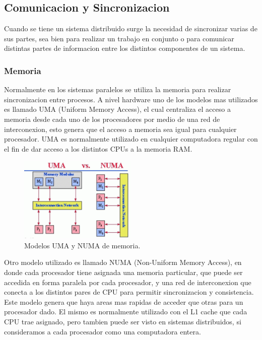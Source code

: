 \documentclass{article}
\begin{document}
\subsection{Comunicacion y Sincronizacion}
Cuando se tiene un sistema distribuido surge la necesidad de sincronizar varias de sus partes, sea bien para realizar un trabajo en conjunto o para comunicar distintas partes de informacion entre los distintos componentes de un sistema.

\subsubsection{Memoria}

Normalmente en los sistemas paralelos se utiliza la memoria para realizar sincronizacion entre procesos. A nivel hardware uno de los modelos mas utilizados es llamado UMA (Uniform Memory Access), el cual centraliza el acceso a memoria desde cada uno de los procesadores por medio de una red de interconexion, esto genera que el acceso a memoria sea igual para cualquier procesador. UMA es normalmente utilizado en cualquier computadora regular con el fin de dar acceso a los distintos CPUs a la memoria RAM. 

\begin{figure}[H]
    \centering
    \includegraphics[width=0.5\textwidth]{imgs/numa_uma.png}
    \caption{Modelos UMA y NUMA de memoria.}
    \label{fig:numa_uma}
\end{figure}

Otro modelo utilizado es llamado NUMA (Non-Uniform Memory Access), en donde cada procesador tiene asignada una memoria particular, que puede ser accedida en forma paralela por cada procesador, y una red de interconexion que conecta a los distintos pares de CPU para permitir sincronizacion y consistencia. Este modelo genera que haya areas mas rapidas de acceder que otras para un procesador dado. El mismo es normalmente utilizado con el L1 cache que cada CPU trae asignado, pero tambien puede ser visto en sistemas distribuidos, si consideramos a cada procesador como una computadora entera.
\end{document}
